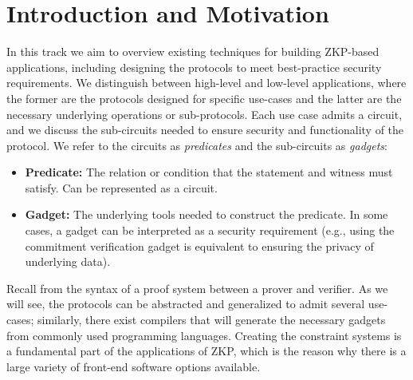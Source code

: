 \section{Introduction and Motivation}
\label{apps:intro}
 
In this track we aim to overview existing techniques for building ZKP-based applications, including designing the protocols to meet best-practice security requirements.
We distinguish between high-level and low-level applications, where the former are the protocols designed for specific use-cases and the latter are the necessary underlying operations or sub-protocols.
Each use case admits a circuit, and we discuss the sub-circuits needed to ensure security and functionality of the protocol.
We refer to the circuits as \emph{predicates} and the sub-circuits as \emph{gadgets}:
\begin{itemize}

\item {\bfseries \hypertarget{def:predicate}{Predicate}:} 
The relation or condition that the statement and witness must satisfy.
Can be represented as a circuit.

\item {}
\textbf{\hypertarget{def:gadget}{Gadget}:} The underlying tools needed to construct the predicate.  
In some cases, a gadget can be interpreted as a security requirement 
(e.g., using the commitment verification gadget is equivalent to ensuring the privacy of underlying data).
\loosen

\end{itemize}


Recall from 
the syntax of a proof system between a prover and verifier.
As we will see, the protocols can be abstracted and generalized to admit several use-cases; 
similarly, there exist compilers that will generate the necessary gadgets from commonly used programming languages. 
Creating the constraint systems is a fundamental part of the applications of ZKP, which is the reason why there is a large variety of front-end software options available.

